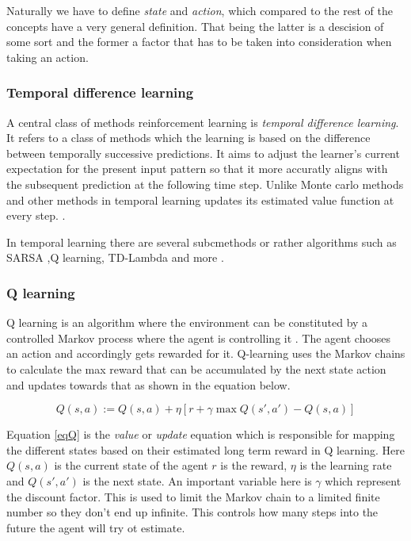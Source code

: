 Naturally we have to define \textit{state} and \textit{action}, which compared to the rest of the concepts have a very general definition. That being the latter is a descision of some sort and the former a factor that has to be taken into consideration when taking an action. 

\subsubsection{Temporal difference learning}

A central class of methods reinforcement learning is \textit{temporal difference learning}. It refers to a class of methods which the learning is based on the difference between temporally successive predictions. It aims to adjust the learner's current expectation for the present input pattern so that it more accuratly aligns with the subsequent prediction at the following time step. Unlike Monte carlo methods and other methods in temporal learning updates its estimated value function at every step. \cite{tesauro1995temporal}. 

In temporal learning there are several subcmethods or rather algorithms such as SARSA ,Q learning, TD-Lambda and more \cite{eiben2007reinforcement}.\\

\subsubsection{Q learning}
Q learning is an algorithm where the environment can be constituted by a controlled Markov process where the agent is controlling it \cite{watkins1992q}. The agent chooses an action and accordingly gets rewarded for it. Q-learning uses the Markov chains to calculate the max reward that can be accumulated by the next state action and updates towards that as shown in the equation below.

\begin{equation} \label{eqQ}
    { Q(s,a) := Q(s,a) + \eta [r + \gamma \max Q(s',a') - Q(s,a)]}
\end{equation}

Equation \ref{eqQ} is the \textit{value} or \textit{update} equation which is responsible for mapping the different states based on their estimated long term reward in Q learning. Here $Q(s,a)$ is the current state of the agent $r$ is the reward, $\eta$ is the learning rate and $Q(s',a')$ is the next state. An important variable here is $\gamma$ which represent the discount factor. This is used to limit the Markov chain to a limited finite number so they don't end up infinite. This controls how many steps into the future the agent will try ot estimate. 


